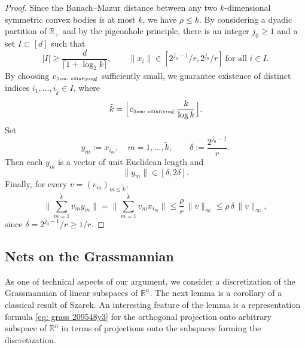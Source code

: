 \documentclass[11pt]{amsart}
\theoremstyle{definition}
\theoremstyle{plain}
\newcommand{\R}{\mathbb{R}}
\def\R{{\mathbb R}}
\begin{document}
\begin{proof}
  Since the Banach--Mazur distance between any two $k$-dimensional symmetric
  convex bodies is at most $k$, we have $\rho\le k$.
  By considering
  a dyadic partition of $\R_+$ and
  by the pigeonhole principle,
  there is an integer $j_0\geq 1$ and a set $I\subset[d]$ such that
  \[
  |I|\ge \frac{d}{\lceil 1+\log_2 k\rceil},
  \qquad
  \|x_i\|\in[2^{j_0-1}/r,2^{j_0}/r]
  \ \text{for all }i\in I.
  \]
  By choosing $c_{\text{\tiny\ref{lem: ellinftyreg}}}$ sufficiently small,
  we guarantee existence of distinct indices $i_1,\dots,i_{\tilde k}\in I$, where
  \[
  \tilde k=\Big\lfloor c_{\text{\tiny\ref{lem: ellinftyreg}}}\,
  \frac{k}{\log k}\Big\rfloor.
  \]
  Set
  \[
  y_m:=x_{i_m},
  \quad m=1,\dots,\tilde k,
  \qquad
  \delta:=\frac{
  2^{j_0-1}}{r}.
  \]
  Then each $y_m$ is a vector of unit Euclidean length and
  \[
  \|y_m\| %
  \in[\delta,2\delta].
  \]
  Finally, for every $v=(v_m)_{m\le\tilde k}$,
  \[
  \Big\|\sum_{m=1}^{\tilde k} v_m y_m\Big\|
  =
  \Big\|\sum_{m=1}^{\tilde k} v_m x_{i_m}\Big\|
  \le
  \frac{\rho}{r}\,\|v\|_\infty
  \le
  \rho\,\delta\,\|v\|_\infty,
  \]
  since $\delta=2^{j_0-1}/r\ge1/r$.
\end{proof}

\subsection{Nets on the Grassmannian}
As one of technical aspects of our argument, we consider a discretization
of the Grassmannian of linear subspaces of $\R^n$. The next lemma is a corollary of 
a classical result \cite{Szarek81} of Szarek.
An interesting feature of the lemma is a representation formula \eqref{eq: grass 209548y3}
for the orthogonal projection onto arbitrary subspace of $\R^n$
in terms of projections onto the subspaces forming the discretization.
\end{document}

